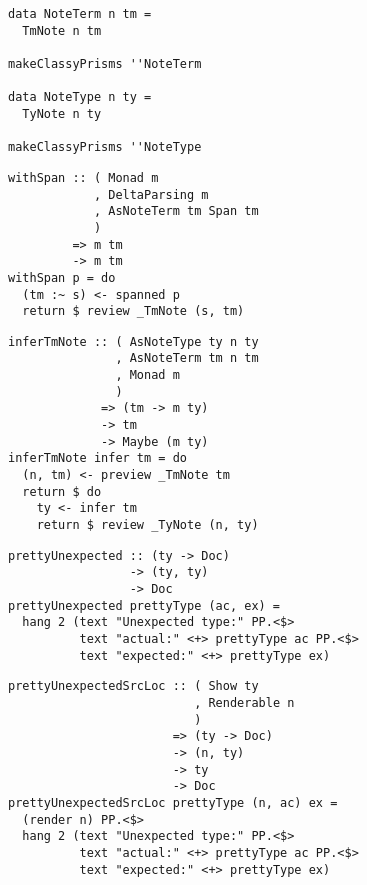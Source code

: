 \documentclass[aspectration=169]{beamer}
\begin{document}
\begin{frame}[fragile]
  \begin{verbatim}
data NoteTerm n tm =
  TmNote n tm

makeClassyPrisms ''NoteTerm

data NoteType n ty =
  TyNote n ty

makeClassyPrisms ''NoteType
  \end{verbatim}
\end{frame} 

\begin{frame}[fragile]
  \begin{verbatim}
withSpan :: ( Monad m
            , DeltaParsing m
            , AsNoteTerm tm Span tm
            )
         => m tm
         -> m tm
withSpan p = do
  (tm :~ s) <- spanned p
  return $ review _TmNote (s, tm)
  \end{verbatim}
\end{frame} 

\begin{frame}[fragile]
  \begin{verbatim}
inferTmNote :: ( AsNoteType ty n ty
               , AsNoteTerm tm n tm
               , Monad m
               )
             => (tm -> m ty)
             -> tm
             -> Maybe (m ty)
inferTmNote infer tm = do
  (n, tm) <- preview _TmNote tm
  return $ do
    ty <- infer tm
    return $ review _TyNote (n, ty)
  \end{verbatim}
\end{frame} 

\begin{frame}[fragile]
  \begin{verbatim}
prettyUnexpected :: (ty -> Doc)
                 -> (ty, ty)
                 -> Doc
prettyUnexpected prettyType (ac, ex) =
  hang 2 (text "Unexpected type:" PP.<$>
          text "actual:" <+> prettyType ac PP.<$>
          text "expected:" <+> prettyType ex)
  \end{verbatim}
\end{frame} 

\begin{frame}[fragile]
  \begin{verbatim}
prettyUnexpectedSrcLoc :: ( Show ty
                          , Renderable n
                          )
                       => (ty -> Doc)
                       -> (n, ty)
                       -> ty
                       -> Doc
prettyUnexpectedSrcLoc prettyType (n, ac) ex =
  (render n) PP.<$>
  hang 2 (text "Unexpected type:" PP.<$>
          text "actual:" <+> prettyType ac PP.<$>
          text "expected:" <+> prettyType ex)
  \end{verbatim}
\end{frame} 
\end{document}
